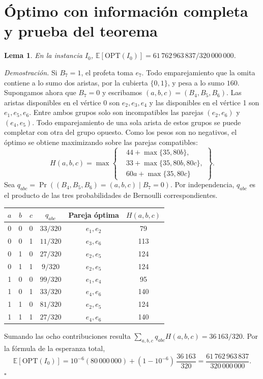 \documentclass[11pt,a4paper]{article}
\newcommand{\E}{\mathbb{E}}
\newcommand{\OPT}{\mathrm{OPT}}
\newcommand{\numoff}{61\,762\,963\,837}
\newcommand{\masa}{320\,000\,000}
\newtheorem{lema}{Lema}
\newenvironment{prueba}[1][Demostración]{\par\smallskip\noindent\textit{#1.}\enspace}{\unskip\nobreak\hfill\(\square\)\par\smallskip}
\begin{document}
\section{Óptimo con información completa y prueba del teorema}
\begin{lema}\label{lem:off}
En la instancia \(I_0\), \(\E[\OPT(I_0)]=\numoff/\masa\).
\end{lema}
\begin{prueba}
Si \(B_7=1\), el profeta toma \(e_7\). Todo emparejamiento que la omita contiene a lo sumo dos aristas, por la cubierta \(\{0,1\}\), y pesa a lo sumo \(160\). Supongamos ahora que \(B_7=0\) y escribamos \((a,b,c)=(B_4,B_5,B_6)\). Las aristas disponibles en el vértice 0 son \(e_2,e_3,e_4\) y las disponibles en el vértice 1 son \(e_1,e_5,e_6\). Entre ambos grupos solo son incompatibles las parejas \((e_2,e_6)\) y \((e_4,e_5)\). Todo emparejamiento de una sola arista de estos grupos se puede completar con otra del grupo opuesto. Como los pesos son no negativos, el óptimo se obtiene maximizando sobre las parejas compatibles:
\[
 H(a,b,c)=\max\left\{
 \begin{aligned}
 &44+\max\{35,80b\},\\
 &33+\max\{35,80b,80c\},\\
 &60a+\max\{35,80c\}
 \end{aligned}\right\}.
\]
Sea \(q_{abc}=\Pr((B_4,B_5,B_6)=(a,b,c)\mid B_7=0)\). Por independencia, \(q_{abc}\) es el producto de las tres probabilidades de Bernoulli correspondientes.
\begin{center}\renewcommand{\arraystretch}{1.14}
\begin{tabular}{@{}ccc@{\qquad}ccc@{}}\toprule
\(a\)&\(b\)&\(c\)&\(q_{abc}\)& Pareja óptima & \(H(a,b,c)\)\\\midrule
0&0&0&\(33/320\)&\(e_1,e_2\)&79\\
0&0&1&\(11/320\)&\(e_3,e_6\)&113\\
0&1&0&\(27/320\)&\(e_2,e_5\)&124\\
0&1&1&\(9/320\)&\(e_2,e_5\)&124\\
1&0&0&\(99/320\)&\(e_1,e_4\)&95\\
1&0&1&\(33/320\)&\(e_4,e_6\)&140\\
1&1&0&\(81/320\)&\(e_2,e_5\)&124\\
1&1&1&\(27/320\)&\(e_4,e_6\)&140\\\bottomrule
\end{tabular}\end{center}


Sumando las ocho contribuciones resulta
\(\sum_{a,b,c}q_{abc}H(a,b,c)=36\,163/320\). Por la fórmula de la esperanza total,
\[
 \E[\OPT(I_0)]
   =10^{-6}(80\,000\,000)+(1-10^{-6})\,\frac{36\,163}{320}
   =\frac{\numoff}{\masa}.
\]
\end{prueba}
\end{document}
